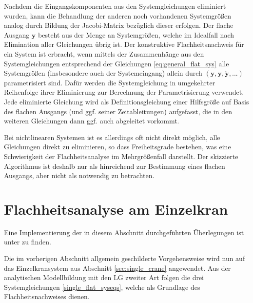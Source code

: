 Nachdem die Eingangskomponenten aus den Systemgleichungen eliminiert wurden, kann die Behandlung der anderen noch vorhandenen Systemgrößen analog durch Bildung der Jacobi-Matrix bezüglich dieser erfolgen. Der  flache Ausgang $\mathbf{y}$ besteht aus der Menge an Systemgrößen, welche im Idealfall nach Elimination aller Gleichungen übrig ist. Der konstruktive Flachheitsnachweis für ein System ist erbracht, wenn mittels der Zusammenhänge aus den Systemgleichungen entsprechend der Gleichungen \eqref{eq:general_flat_sys} alle Systemgrößen (insbesondere auch der Systemeingang) allein durch $(\mathbf{y}, \dot{\mathbf{y}}, \ddot{\mathbf{y}}, ...)$ parametrisiert sind. Dafür werden die Systemgleichung in umgekehrter Reihenfolge ihrer Eliminierung zur Berechnung der Parametrisierung verwendet. Jede eliminierte Gleichung wird als Definitionsgleichung einer Hilfsgröße auf Basis des flachen Ausgangs (und ggf. seiner Zeitableitungen) aufgefasst, die in den weiteren Gleichungen dann ggf. auch abgeleitet vorkommt.

Bei nichtlinearen Systemen ist es allerdings oft nicht direkt möglich, alle Gleichungen direkt zu eliminieren, so dass Freiheitsgrade bestehen, was eine Schwierigkeit der Flachheitsanalyse im Mehrgrößenfall darstellt. Der skizzierte Algorithmus ist deshalb nur als hinreichend zur Bestimmung eines flachen Ausgangs, aber nicht als notwendig zu betrachten.

\section{Flachheitsanalyse am Einzelkran}
\label{sec:flatness_single_crane}
Eine Implementierung der in diesem Abschnitt durchgeführten Überlegungen ist unter \cite[flatness\_notebooks/ODE\_flatness\_analysis\_single\_crane.ipynb]{SAGithub} zu finden.

Die im vorherigen Abschnitt allgemein geschilderte Vorgehensweise wird nun auf das Einzelkransystem aus Abschnitt \ref{sec:single_crane} angewendet. Aus der analytischen Modellbildung mit den LG zweiter Art folgen die drei Systemgleichungen \eqref{single_flat_syseqs}, welche als Grundlage des Flachheitsnachweises dienen. 

